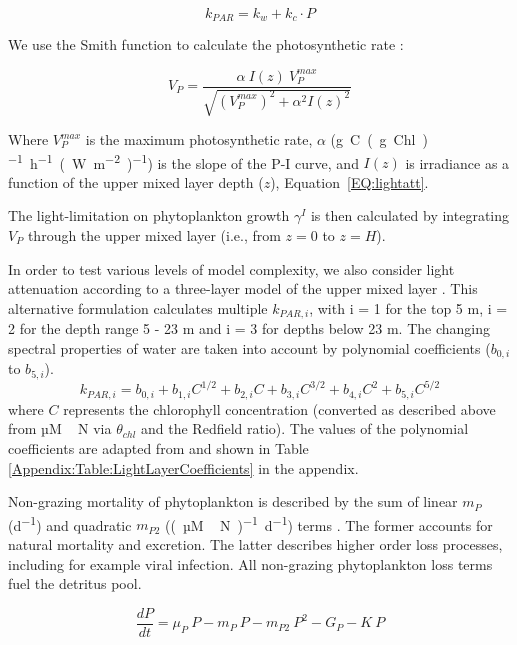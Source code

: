 \documentclass[gmd, manuscript]{copernicus}
\begin{document}
\begin{equation}
    k_{PAR} = k_w + k_c \cdot P
    \label{EQ:beerslaw}
\end{equation}

We use the Smith function to calculate the photosynthetic rate \citep{Anderson1993APhotosynthesis}:

\begin{equation}
    V_P = \frac{\alpha ~ I(z) ~ V_P^{max}}{\sqrt{(V_P^{max})^2 + \alpha^2 I(z)^2}}
\end{equation}

Where $V_P^{max}$ is the maximum photosynthetic rate, $\alpha$ (\unit{g C (g Chl)^{-1} h^{-1} (W m^{-2})^{-1}}) is the slope of the P-I curve, and $I(z)$ is irradiance as a function of the upper mixed layer depth ($z$), Equation~\ref{EQ:lightatt}.

The light-limitation on phytoplankton growth $\gamma^{I}$ is then calculated by integrating $V_P$ through the upper mixed layer (i.e., from $z=0$ to $z=H$).

In order to test various levels of model complexity, we also consider light attenuation according to a three-layer model of the upper mixed layer \citep{Anderson1993APhotosynthesis}. This alternative formulation calculates multiple $k_{PAR, i}$, with i = 1 for the top 5 \unit{m}, i = 2 for the depth range 5 - 23 \unit{m} and i = 3 for depths below 23 \unit{m}. The changing spectral properties of water are taken into account by polynomial coefficients ($b_{0,i}$ to $b_{5,i}$).
\begin{equation}
    k_{PAR, i} = b_{0,i} + b_{1,i} C^{1/2} + b_{2,i} C + b_{3,i} C^{3/2} + b_{4,i} C^2 + b_{5,i} C^{5/2}
    \label{EQ:piecewiselight}
\end{equation}
where $C$ represents the chlorophyll concentration (converted as described above from \unit{µM\,N} via $\theta_{chl}$ and the Redfield ratio). The values of the polynomial coefficients are adapted from \citet{Anderson2015c} and shown in Table \ref{Appendix:Table:LightLayerCoefficients} in the appendix.

Non-grazing mortality of phytoplankton is described by the sum of linear $m_P$ (\unit{d^{-1}}) and quadratic $m_{P2}$ (\unit{(µM\,N)^{-1} d^{−1}}) terms \citep{Yool2011Medusa-1.0:Domain}. The former accounts for natural mortality and excretion. The latter describes higher order loss processes, including for example viral infection. All non-grazing phytoplankton loss terms fuel the detritus pool.

\begin{equation}
    \label{Eq:EmpowerPhyto}
    \frac{d P}{d t} =
    \mu_{P} \ P  %
    - m_P \ P %
    - m_{P2} \ P^2 %
    - G_P %
    - K \ P %
\end{equation}
\end{document}
